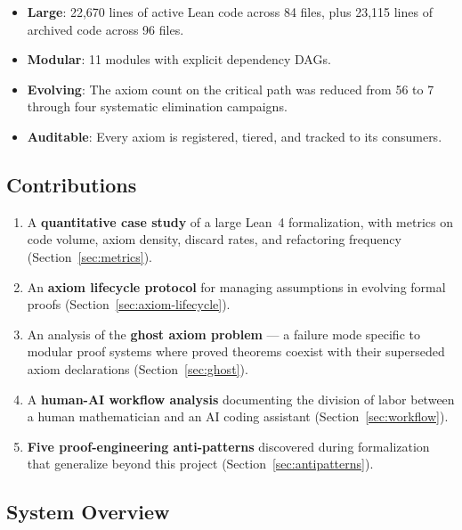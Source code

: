 \documentclass[11pt,a4paper]{article}
\theoremstyle{definition}
\begin{document}
\begin{itemize}
  \item \textbf{Large}: 22,670 lines of active Lean code across 84 files,
    plus 23,115 lines of archived code across 96 files.
  \item \textbf{Modular}: 11 modules with explicit dependency DAGs.
  \item \textbf{Evolving}: The axiom count on the critical path was
    reduced from 56 to 7 through four systematic elimination campaigns.
  \item \textbf{Auditable}: Every axiom is registered, tiered, and tracked
    to its consumers.
\end{itemize}

\subsection{Contributions}

\begin{enumerate}
  \item A \textbf{quantitative case study} of a large Lean~4 formalization,
    with metrics on code volume, axiom density, discard rates, and
    refactoring frequency (Section~\ref{sec:metrics}).
  \item An \textbf{axiom lifecycle protocol} for managing assumptions
    in evolving formal proofs (Section~\ref{sec:axiom-lifecycle}).
  \item An analysis of the \textbf{ghost axiom problem} --- a failure
    mode specific to modular proof systems where proved theorems
    coexist with their superseded axiom declarations
    (Section~\ref{sec:ghost}).
  \item A \textbf{human-AI workflow analysis} documenting the division
    of labor between a human mathematician and an AI coding assistant
    (Section~\ref{sec:workflow}).
  \item \textbf{Five proof-engineering anti-patterns} discovered during
    formalization that generalize beyond this project
    (Section~\ref{sec:antipatterns}).
\end{enumerate}

\subsection{System Overview}
\end{document}
